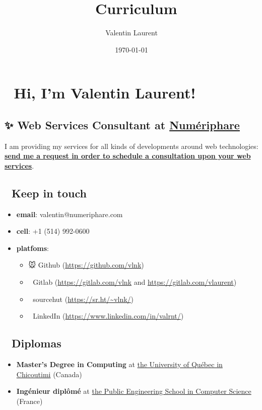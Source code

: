 \documentclass[11pt]{article}
\author{Valentin Laurent}
\date{\today}
\title{👔 Curriculum}
\begin{document}
\maketitle
\section{👋 Hi, I'm Valentin Laurent!}
\label{sec:orgcd70380}
\subsection{✨ \textbf{Web Services Consultant} at \href{https://www.numeriphare.com/}{Numériphare}}
\label{sec:org4ee107e}

I am providing my services for all kinds of developments around web technologies: \href{https://framaforms.org/numeriphare-contact-en-1666988238}{\textbf{send me a request in order to schedule a consultation upon your web services}}.

\subsection{📇 Keep in touch}
\label{sec:org665ed38}
\begin{itemize}
\item \textbf{email}: valentin@numeriphare.com
\item \textbf{cell}: +1 (514) 992-0600
\item \textbf{platfoms}:
\begin{itemize}
\item 🐭 Github (\url{https://github.com/vlnk})
\item 🚀 Gitlab (\url{https://gitlab.com/vlnk} and \url{https://gitlab.com/vlaurent})
\item 🌲 sourcehut (\url{https://sr.ht/\~vlnk/})
\item 👞 LinkedIn (\url{https://www.linkedin.com/in/valrnt/})
\end{itemize}
\end{itemize}

\subsection{🏫 Diplomas}
\label{sec:org3c6797c}

\begin{itemize}
\item \textbf{Master's Degree in Computing} at \href{https://www.linkedin.com/school/choisiruqac/}{the University of Québec in Chicoutimi} (Canada)
\item \textbf{Ingénieur diplômé} at \href{https://www.linkedin.com/school/isima-clermont-auvergne-inp/}{the Public Engineering School in Computer Science} (France)
\end{itemize}
\end{document}
